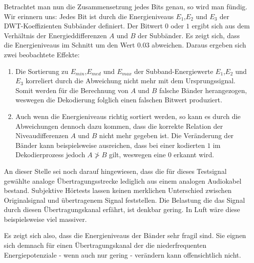 Betrachtet man nun die Zusammensetzung jedes Bits genau, so wird man fündig. Wir erinnern uns: Jedes Bit ist durch die Energieniveaus ${E}_{1}$,${E}_{2}$ und ${E}_{3}$ der DWT-Koeffizienten Subbänder definiert. Der Bitwert $0$ oder $1$ ergibt sich aus dem Verhältnis der Energieddifferenzen $A$ und $B$ der Subbänder. Es zeigt sich, dass die Energieniveaus im Schnitt um den Wert $0.03$ abweichen. Daraus ergeben sich zwei beobachtete Effekte:

\begin{enumerate}
		
\item Die Sortierung zu ${E}_{min}$,${E}_{med}$ und ${E}_{max}$ der Subband-Energiewerte ${E}_{1}$,${E}_{2}$ und ${E}_{3}$ korreliert durch die Abweichung nicht mehr mit dem Ursprungssignal. Somit werden für die Berechnung von $A$ und $B$ falsche Bänder herangezogen, weswegen die Dekodierung folglich einen falschen Bitwert produziert. 
	
\item Auch wenn die Energieniveaus richtig sortiert werden, so kann es durch die Abweichungen dennoch dazu kommen, dass die korrekte Relation der Niveaudifferenzen $A$ und $B$ nicht mehr gegeben ist. Die Veränderung der Bänder kann beispielsweise ausreichen, dass bei einer kodierten $1$ im Dekodierprozess jedoch $A \ngtr B$ gilt, weswegen eine $0$ erkannt wird.
	
\end{enumerate}

An dieser Stelle sei noch darauf hingewiesen, dass die für dieses Testsignal gewählte analoge Übertragungsstrecke lediglich aus einem analogen Audiokabel bestand. Subjektive Hörtests lassen keinen merklichen Unterschied zwischen Originalsignal und übertragenem Signal feststellen. Die Belastung die das Signal durch diesen Übertragungskanal erfährt, ist denkbar gering. In Luft wäre diese beispielsweise viel massiver. 

Es zeigt sich also, dass die Energieniveaus der Bänder sehr fragil sind. Sie eignen sich demnach für einen Übertragungskanal der die niederfrequenten Energiepotenziale - wenn auch nur gering - verändern kann offensichtlich nicht. 